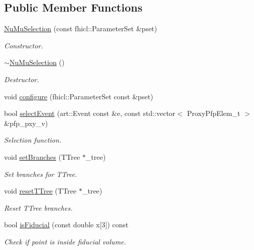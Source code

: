 \subsection*{Public Member Functions}
\begin{DoxyCompactItemize}
\item 
\hyperlink{classselection_1_1NuMuSelection_a6c36dee1cdd9d72715fd43325dfdd585}{Nu\+Mu\+Selection} (const fhicl\+::\+Parameter\+Set \&pset)
\begin{DoxyCompactList}\small\item\em Constructor. \end{DoxyCompactList}\item 
\hyperlink{classselection_1_1NuMuSelection_af2a4b263e268fc51f0fa58ea4ad74ee4}{$\sim$\+Nu\+Mu\+Selection} ()\hypertarget{classselection_1_1NuMuSelection_af2a4b263e268fc51f0fa58ea4ad74ee4}{}\label{classselection_1_1NuMuSelection_af2a4b263e268fc51f0fa58ea4ad74ee4}

\begin{DoxyCompactList}\small\item\em Destructor. \end{DoxyCompactList}\item 
void \hyperlink{classselection_1_1NuMuSelection_a81a56e38f0c105c5ef34a3c777c2ff1d}{configure} (fhicl\+::\+Parameter\+Set const \&pset)
\item 
bool \hyperlink{classselection_1_1NuMuSelection_ad9aaf5eedf311e33cb6e7f54e2605c98}{select\+Event} (art\+::\+Event const \&e, const std\+::vector$<$ Proxy\+Pfp\+Elem\+\_\+t $>$ \&pfp\+\_\+pxy\+\_\+v)
\begin{DoxyCompactList}\small\item\em Selection function. \end{DoxyCompactList}\item 
void \hyperlink{classselection_1_1NuMuSelection_ac8305341911433f5e08ee705280199d4}{set\+Branches} (T\+Tree $\ast$\+\_\+tree)
\begin{DoxyCompactList}\small\item\em Set branches for T\+Tree. \end{DoxyCompactList}\item 
void \hyperlink{classselection_1_1NuMuSelection_a18b4df2675c0622cb5fbe00711350328}{reset\+T\+Tree} (T\+Tree $\ast$\+\_\+tree)
\begin{DoxyCompactList}\small\item\em Reset T\+Tree branches. \end{DoxyCompactList}\item 
bool \hyperlink{classselection_1_1NuMuSelection_a8d363b7e57166d4711020245db1b73b1}{is\+Fiducial} (const double x\mbox{[}3\mbox{]}) const 
\begin{DoxyCompactList}\small\item\em Check if point is inside fiducial volume. \end{DoxyCompactList}\end{DoxyCompactItemize}
